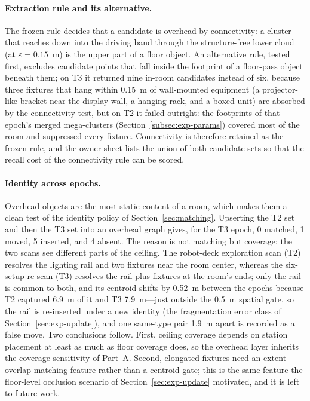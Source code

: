 \paragraph{Extraction rule and its alternative.}
The frozen rule decides that a candidate is overhead by connectivity: a
cluster that reaches down into the driving band through the structure-free
lower cloud (at $\varepsilon=0.15$~m) is the upper part of a floor object. An
alternative rule, tested first, excludes candidate points that fall inside
the footprint of a floor-pass object beneath them; on T3 it returned nine
in-room candidates instead of six, because three fixtures that hang within
0.15~m of wall-mounted equipment (a projector-like bracket near the display
wall, a hanging rack, and a boxed unit) are absorbed by the connectivity
test, but on T2 it failed outright: the footprints of that epoch's merged
mega-clusters (Section~\ref{subsec:exp-params}) covered most of the room and
suppressed every fixture. Connectivity is therefore retained as the frozen
rule, and the owner sheet lists the union of both candidate sets so that
the recall cost of the connectivity rule can be scored.

\paragraph{Identity across epochs.}
Overhead objects are the most static content of a room, which makes them a
clean test of the identity policy of Section~\ref{sec:matching}. Upserting
the T2 set and then the T3 set into an overhead graph gives, for the T3
epoch, 0 matched, 1 moved, 5 inserted, and 4 absent. The reason is not
matching but coverage: the two scans see different parts of the ceiling. The
robot-deck exploration scan (T2) resolves the lighting rail and two fixtures
near the room center, whereas the six-setup re-scan (T3) resolves the rail
plus fixtures at the room's ends; only the rail is common to both, and its
centroid shifts by 0.52~m between the epochs because T2 captured 6.9~m of it
and T3 7.9~m---just outside the 0.5~m spatial gate, so the rail is
re-inserted under a new identity (the fragmentation error class of
Section~\ref{sec:exp-update}), and one same-type pair 1.9~m apart is
recorded as a false move. Two conclusions follow. First, ceiling coverage
depends on station placement at least as much as floor coverage does, so
the overhead layer inherits the coverage sensitivity of Part~A. Second,
elongated fixtures need an extent-overlap matching feature rather than a
centroid gate; this is the same feature the floor-level occlusion scenario
of Section~\ref{sec:exp-update} motivated, and it is left to future work.

